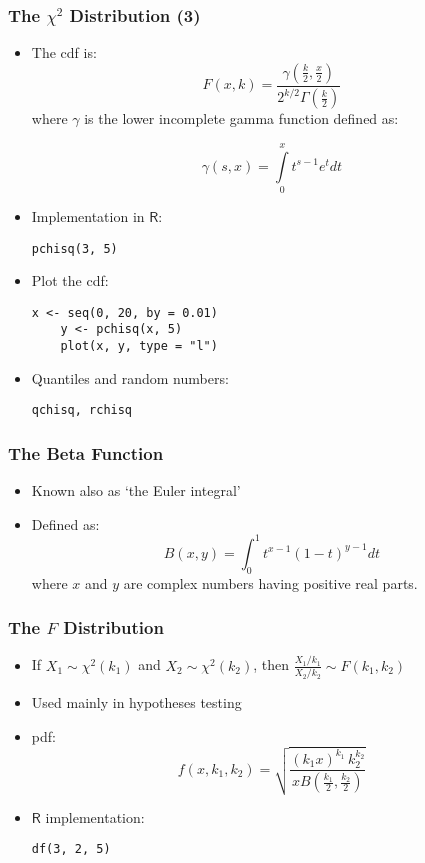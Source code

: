 \documentclass[10pt]{beamer}
\theoremstyle{definition}
\begin{document}
\begin{frame}[fragile]
\frametitle{The $\chi^{2}$ Distribution (3)}
\begin{itemize}
	\item The cdf is:
	\[
		F(x,k) = 	\frac{\gamma\left(\frac{k}{2},\frac{x}{2}\right)}{2^{k/2}\Gamma\left(\frac{k}{2}\right)}
	\]
	where $\gamma$ is the lower incomplete gamma function defined as:
	
	\[
		\gamma(s,x) = \int\limits_{0}^{x}t^{s-1}e^{t}dt
	\]
	
	\item Implementation in $\mathsf{R}$:
	\begin{lstlisting}[style = rstyle, breaklines]
	pchisq(3, 5)
	\end{lstlisting}
	
	\item Plot the cdf:
	\begin{lstlisting}[style = rstyle, breaklines]
	x <- seq(0, 20, by = 0.01)
	y <- pchisq(x, 5)
	plot(x, y, type = "l")
	\end{lstlisting}
	
	\item Quantiles and random numbers:
	\begin{lstlisting}[style = rstyle, breaklines]
	qchisq, rchisq
	\end{lstlisting}
\end{itemize}
\end{frame}

\begin{frame}[fragile]
\frametitle{The Beta Function}
\begin{itemize}
	\item Known also as `the Euler integral'

	\item Defined as:
	\[
		B(x, y) = \int_{0}^{1}t^{x-1}(1-t)^{y-1}dt
	\]
	where $x$ and $y$ are complex numbers having positive real parts.
\end{itemize}
\end{frame}
 
\begin{frame}[fragile]
\frametitle{The $F$ Distribution}
\begin{itemize}
	\item If $X_{1} \sim \chi^{2}(k_{1})$ and $X_{2} \sim \chi^{2}(k_{2})$, then $\displaystyle \frac{X_{1}/k_{1}}{X_{2}/k_{2}} \sim F(k_{1},k_{2})$

	\item Used mainly in hypotheses testing

	\item pdf:
	\[
		f(x,k_{1},k_{2}) = \sqrt{\frac{(k_{1}x)^{k_{1}}\,k_{2}^{k_{2}}}{xB\left(\frac{k_{1}}{2},\frac{k_{2}}{2}\right)}}
	\]

	\item $\mathsf{R}$ implementation:
	\begin{lstlisting}[style = rstyle, breaklines]
	df(3, 2, 5)
	\end{lstlisting}
\end{itemize}
\end{frame}
\end{document}
